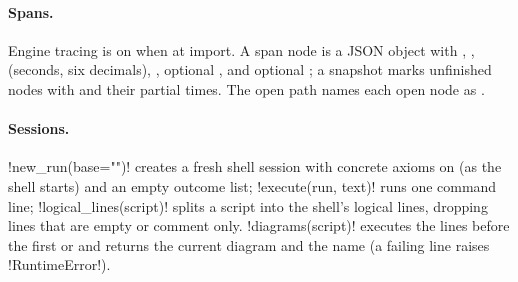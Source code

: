 \paragraph{Spans.} Engine tracing is on when  at import. A span node is
a JSON object with , ,  (seconds, six decimals), ,
optional , and optional ; a snapshot marks unfinished nodes with
 and their partial times. The open path names each open node as
.

\paragraph{Sessions.} \py!new_run(base="")! creates a fresh shell session with concrete axioms on
(as the shell starts) and an empty outcome list; \py!execute(run, text)! runs one command line;
\py!logical_lines(script)! splits a script into the shell's logical lines, dropping lines that are
empty or comment only. \py!diagrams(script)! executes the lines before the first  or
 and returns the current diagram and the name  (a failing line raises
\py!RuntimeError!).

